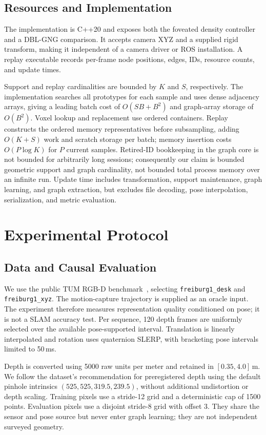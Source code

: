 \documentclass[letterpaper,10pt,conference]{template/ieeeconf}
\begin{document}
\subsection{Resources and Implementation}
The implementation is C++20 and exposes both the foveated density controller and a DBL-GNG comparison. It accepts camera XYZ and a supplied rigid transform, making it independent of a camera driver or ROS installation. A replay executable records per-frame node positions, edges, IDs, resource counts, and update times.

Support and replay cardinalities are bounded by $K$ and $S$, respectively. The implementation searches all prototypes for each sample and uses dense adjacency arrays, giving a leading batch cost of $O(SB+B^2)$ and graph-array storage of $O(B^2)$. Voxel lookup and replacement use ordered containers. Replay constructs the ordered memory representatives before subsampling, adding $O(K+S)$ work and scratch storage per batch; memory insertion costs $O(P\log K)$ for $P$ current samples. Retired-ID bookkeeping in the graph core is not bounded for arbitrarily long sessions; consequently our claim is bounded geometric support and graph cardinality, not bounded total process memory over an infinite run. Update time includes transformation, support maintenance, graph learning, and graph extraction, but excludes file decoding, pose interpolation, serialization, and metric evaluation.

\section{Experimental Protocol}
\subsection{Data and Causal Evaluation}
We use the public TUM RGB-D benchmark~\cite{sturm2012tum}, selecting \texttt{freiburg1\_desk} and \texttt{freiburg1\_xyz}. The motion-capture trajectory is supplied as an oracle input. The experiment therefore measures representation quality conditioned on pose; it is not a SLAM accuracy test. Per sequence, 120 depth frames are uniformly selected over the available pose-supported interval. Translation is linearly interpolated and rotation uses quaternion SLERP, with bracketing pose intervals limited to 50\,ms.

Depth is converted using 5000 raw units per meter and retained in $[0.35,4.0]$\,m. We follow the dataset's recommendation for preregistered depth using the default pinhole intrinsics $(525,525,319.5,239.5)$, without additional undistortion or depth scaling. Training pixels use a stride-12 grid and a deterministic cap of 1500 points. Evaluation pixels use a disjoint stride-8 grid with offset 3. They share the sensor and pose source but never enter graph learning; they are not independent surveyed geometry.
\end{document}
